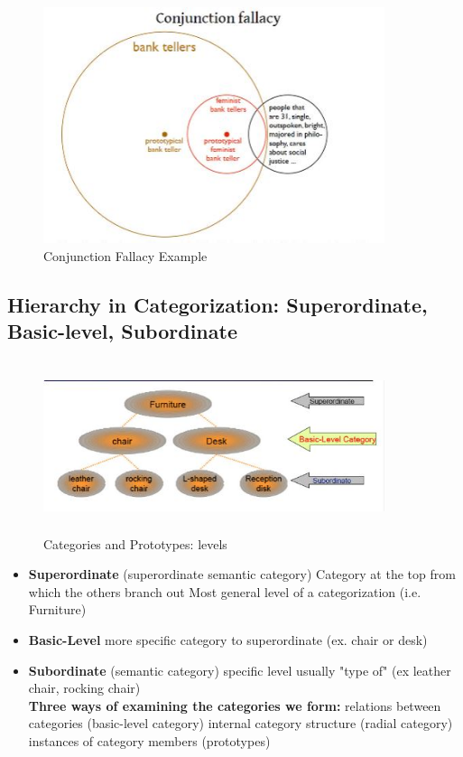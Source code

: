 \documentclass{article}
\begin{document}
\begin{figure}[htp]
\centering
\includegraphics[width=10cm]{images/conjunctionfallacy.JPG}
\caption{Conjunction Fallacy Example}
\label{fig: conjunction}
\end{figure}

\subsection{Hierarchy in Categorization: Superordinate, Basic-level, Subordinate}

\begin{figure}[htp]
\centering
\includegraphics[width=10cm, height=5cm]{images/prototypelevel.JPG}
\caption{Categories and Prototypes: levels}
\label{fig: categories}
\end{figure}

\begin{itemize}
    \item \textbf{Superordinate} (superordinate semantic category)
        \subitem Category at the top from which the others branch out
        \subitem Most general level of a categorization (i.e. Furniture)
    \item \textbf{Basic-Level}
        \subitem more specific category to superordinate (ex. chair or desk) 
    \item \textbf{Subordinate} (semantic category) 
        \subitem specific level usually "type of" (ex leather chair, rocking chair) \\
        
\textbf{Three ways of examining the categories we form: }
    \subitem relations between categories (basic-level category) 
    \subitem internal category structure (radial category) 
    \subitem instances of category members (prototypes) 
\end{itemize}
\end{document}
